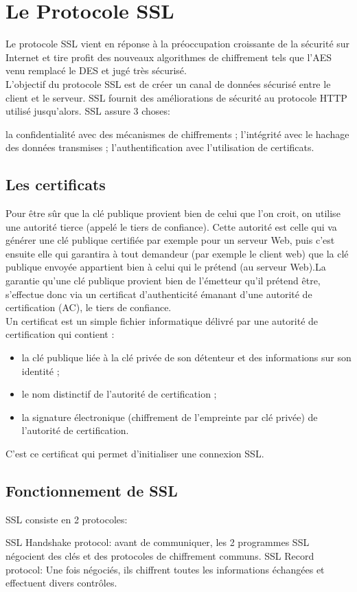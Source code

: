 \section*{Le Protocole SSL}
Le protocole SSL vient en réponse à la préoccupation croissante de la sécurité sur Internet et tire profit des nouveaux algorithmes de chiffrement tels que l’AES venu remplacé le DES et jugé très sécurisé. \\
L’objectif du protocole SSL est de créer un canal de données sécurisé entre le client et le serveur. SSL fournit des améliorations de sécurité au protocole HTTP utilisé jusqu'alors. 
SSL assure 3 choses:
\begin{itemize}
	\itemcheck la confidentialité avec des mécanismes de chiffrements ;
	\itemcheck l’intégrité avec le hachage des données transmises ;
	\itemcheck l’authentification avec l’utilisation de certificats.
\end{itemize}
\subsection*{Les certificats}
Pour être sûr que la clé publique provient bien de celui que l'on croit, on utilise une autorité tierce (appelé le tiers de confiance). Cette autorité est celle qui va générer une clé publique certifiée par exemple pour un serveur Web, puis c'est ensuite elle qui garantira à tout demandeur (par exemple le client web) que la clé publique envoyée appartient bien à celui qui le prétend (au serveur Web).La garantie qu'une clé publique provient bien de l'émetteur qu'il prétend être, s'effectue donc via un certificat d'authenticité émanant d'une autorité de certification (AC), le tiers de confiance.\\
Un certificat est un simple fichier informatique délivré par une autorité de certification qui contient :
\begin{itemize}
	 \item la clé publique liée à la clé privée de son détenteur et des informations sur son identité ;
	 \item le nom distinctif de l'autorité de certification ;
	 \item la signature électronique (chiffrement de l'empreinte par clé privée) de l'autorité de certification.
\end{itemize}
C’est ce certificat qui permet d’initialiser une connexion SSL.
\subsection*{Fonctionnement de SSL}
SSL consiste en 2 protocoles:
\begin{itemize}
	\itemcheck SSL Handshake protocol: avant de communiquer, les 2 programmes SSL négocient des clés et des protocoles de chiffrement communs.
	\itemcheck SSL Record protocol: Une fois négociés, ils chiffrent toutes les informations échangées et effectuent divers contrôles.
\end{itemize}


